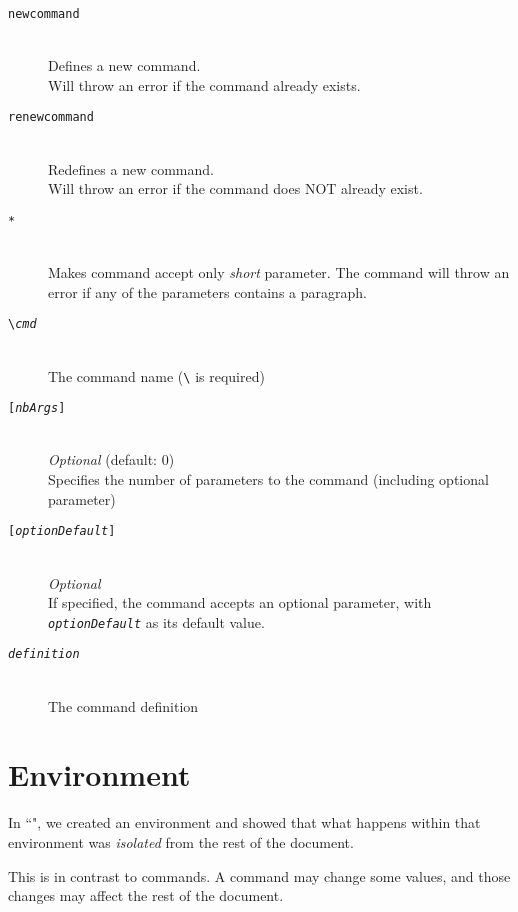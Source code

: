 \begin{description}
	\item[\phantom{aa}\texttt{newcommand}] \mbox{} \\
		Defines a new command.  \\
		Will throw an error if the command already exists. \\
	\item[\phantom{aa}\texttt{renewcommand}] \mbox{} \\
		Redefines a new command.  \\
		Will throw an error if the command does NOT already exist. \\
	\item[\phantom{aa}\texttt{*}] \mbox{} \\
		Makes command accept only \emph{short} parameter.
		The command will throw an error if any of the parameters contains a paragraph. \\
	\item[\phantom{aa}\texttt{\textbackslash \emph{cmd}}] \mbox{} \\
		The command name (\texttt{\textbackslash} is required) \\
	\item[\phantom{aa}\texttt{[\emph{nbArgs}]}] \mbox{} \\
		\emph{Optional} (default: 0) \\
		Specifies the number of parameters to the command (including optional parameter) \\
	\item[\phantom{aa}\texttt{[\emph{optionDefault}]}] \mbox{} \\
		\emph{Optional} \\
		If specified, the command accepts an optional parameter, with \texttt{\emph{optionDefault}} as its default value.\\
	\item[\phantom{aa}\texttt{\emph{definition}}] \mbox{} \\
		The command definition	
\end{description}


\newpage

\section{Environment}

In ``", we created an environment and showed that what happens within that environment was \emph{isolated} from the rest of the document.

This is in contrast to commands. A command may change some values, and those changes may affect the rest of the document. \\

